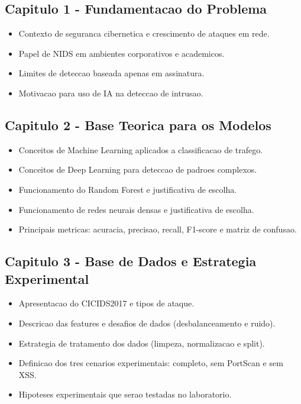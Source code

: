 \subsection{Capitulo 1 - Fundamentacao do Problema}
\begin{itemize}
\item Contexto de seguranca cibernetica e crescimento de ataques em rede.
\item Papel de NIDS em ambientes corporativos e academicos.
\item Limites de deteccao baseada apenas em assinatura.
\item Motivacao para uso de IA na deteccao de intrusao.
\end{itemize}

\subsection{Capitulo 2 - Base Teorica para os Modelos}
\begin{itemize}
\item Conceitos de Machine Learning aplicados a classificacao de trafego.
\item Conceitos de Deep Learning para deteccao de padroes complexos.
\item Funcionamento do Random Forest e justificativa de escolha.
\item Funcionamento de redes neurais densas e justificativa de escolha.
\item Principais metricas: acuracia, precisao, recall, F1-score e matriz de confusao.
\end{itemize}

\subsection{Capitulo 3 - Base de Dados e Estrategia Experimental}
\begin{itemize}
\item Apresentacao do CICIDS2017 e tipos de ataque.
\item Descricao das features e desafios de dados (desbalanceamento e ruido).
\item Estrategia de tratamento dos dados (limpeza, normalizacao e split).
\item Definicao dos tres cenarios experimentais: completo, sem PortScan e sem XSS.
\item Hipoteses experimentais que serao testadas no laboratorio.
\end{itemize}

